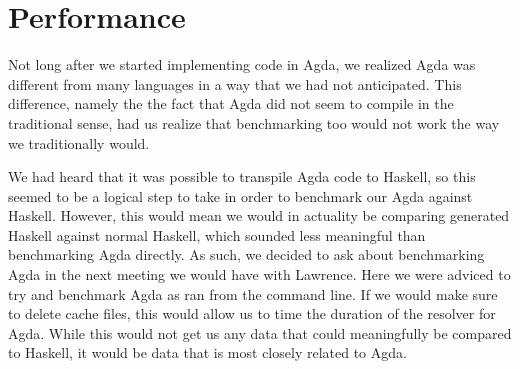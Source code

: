 \documentclass[a4paper,UKenglish,cleveref, autoref, thm-restate]{template/lipics-v2021}
\begin{document}
\section{Performance}


Not long after we started implementing code in Agda, we realized Agda was different from many languages in a way that we had not anticipated. This difference, namely the the fact that Agda did not seem to compile in the traditional sense, had us realize that benchmarking too would not work the way we traditionally would.

We had heard that it was possible to transpile Agda code to Haskell, so this seemed to be a logical step to take in order to benchmark our Agda against Haskell. However, this would mean we would in actuality be comparing generated Haskell against normal Haskell, which sounded less meaningful than benchmarking Agda directly. As such, we decided to ask about benchmarking Agda in the next meeting we would have with Lawrence.\newline 
Here we were adviced to try and benchmark Agda as ran from the command line. If we would make sure to delete cache files, this would allow us to time the duration of the resolver for Agda. While this would not get us any data that could meaningfully be compared to Haskell, it would be data that is most closely related to Agda.
\end{document}
